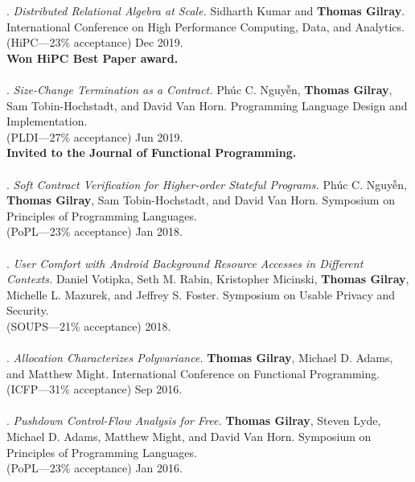 \paper. \textit{Distributed Relational Algebra at Scale.}
Sidharth Kumar and \textbf{Thomas Gilray}.
International Conference on High Performance Computing, Data, and Analytics.
\\(HiPC---23\% acceptance) Dec 2019. 
\\\textbf{Won HiPC Best Paper award.} \\ \vspace{-0.1cm}\\
\paper. \textit{Size-Change Termination as a Contract.}
Phúc C. Nguyễn, \textbf{Thomas Gilray}, Sam Tobin-Hochstadt, and David Van Horn.
Programming Language Design and Implementation.
\\(PLDI---27\% acceptance) Jun 2019. 
\\\textbf{Invited to the Journal of Functional Programming.} \\ \vspace{-0.1cm}\\
\paper. \textit{Soft Contract Verification for Higher-order Stateful Programs.}
Phúc C. Nguyễn, \textbf{Thomas Gilray}, Sam Tobin-Hochstadt, and David Van Horn.
Symposium on Principles of Programming Languages.
\\(PoPL---23\% acceptance) Jan 2018. 
\\ \vspace{-0.1cm}\\
\paper. \textit{User Comfort with Android Background Resource Accesses in Different Contexts.}
Daniel Votipka, Seth M. Rabin, Kristopher Micinski, \textbf{Thomas Gilray}, Michelle L. Mazurek, and Jeffrey S. Foster.
Symposium on Usable Privacy and Security.
\\(SOUPS---21\% acceptance) 2018. 
\\ \vspace{-0.1cm}\\
\paper. \textit{Allocation Characterizes Polyvariance.}
\textbf{Thomas Gilray}, Michael D. Adams, and Matthew Might.
International Conference on Functional Programming.
\\(ICFP---31\% acceptance) Sep 2016. 
\\ \vspace{-0.1cm}\\
\paper. \textit{Pushdown Control-Flow Analysis for Free.}
\textbf{Thomas Gilray}, Steven Lyde, Michael D. Adams, Matthew Might, and David Van Horn.
Symposium on Principles of Programming Languages.
\\(PoPL---23\% acceptance) Jan 2016. 
\\ \vspace{-0.1cm}\\
